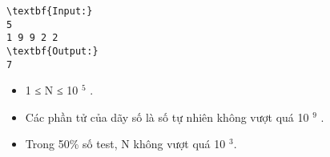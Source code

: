 \begin{verbatim}
\textbf{Input:}
5
1 9 9 2 2
\textbf{Output:}
7\end{verbatim}
\begin{itemize}
	\item 1 ≤ N ≤ 10 $^ 5 $ .
	\item Các phần tử của dãy số là số tự nhiên không vượt quá 10 $^ 9 $ .
	\item Trong 50\% số test, N không vượt quá 10 $^ 3$.
\end{itemize}
